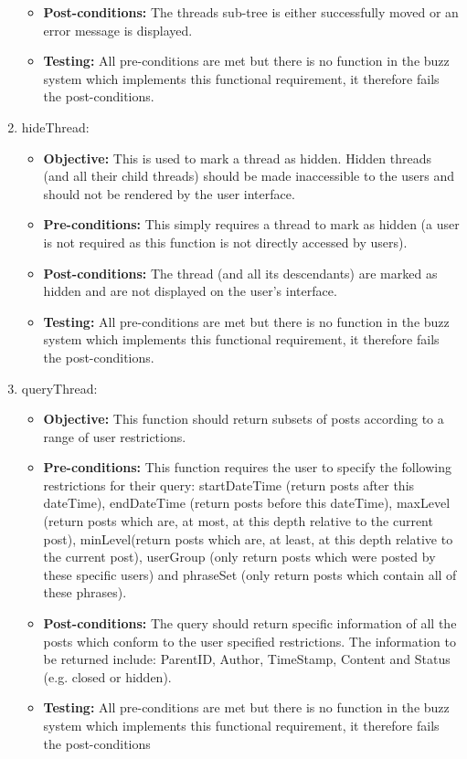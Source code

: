 \begin{enumerate}
\begin{itemize}
		\item\textbf{Post-conditions: }The threads sub-tree is either successfully moved or an error message is displayed.
		\item\textbf{Testing: } All pre-conditions are met but there is no function in the buzz system which implements this functional requirement, it therefore fails the post-conditions.
	\end{itemize}
\item hideThread:
	\begin{itemize}
		\item\textbf{Objective: } This is used to mark a thread as hidden. Hidden threads (and all their child threads) should be made inaccessible  to the users and should not be rendered by the user interface.
		\item\textbf{Pre-conditions: } This simply requires a thread to mark as hidden (a user is not required as this function is not directly accessed by users).
		\item\textbf{Post-conditions: }The thread (and all its descendants) are marked as hidden and are not displayed on the user's interface.
		\item\textbf{Testing: }  All pre-conditions are met but there is no function in the buzz system which implements this functional requirement, it therefore fails the post-conditions.
	\end{itemize}
\item queryThread:
	\begin{itemize}
		\item\textbf{Objective: } This function should return subsets of posts  according to a range of user restrictions.
		\item\textbf{Pre-conditions: }  This function requires  the user to specify the following restrictions for their query: startDateTime (return posts after this dateTime), endDateTime (return posts before this dateTime), maxLevel (return posts which are, at most, at this depth relative to the current post), minLevel(return posts which are, at least, at this depth relative to the current post), userGroup (only return posts which were posted by these specific users) and phraseSet (only return posts which contain all of these phrases).
		\item\textbf{Post-conditions: }The query should return specific information of all the posts which conform to the user specified restrictions. The information to be returned include: ParentID, Author, TimeStamp, Content and Status (e.g. closed or hidden).
		\item\textbf{Testing: } All pre-conditions are met but there is no function in the buzz system which implements this functional requirement, it therefore fails the post-conditions
	\end{itemize}
\end{enumerate}